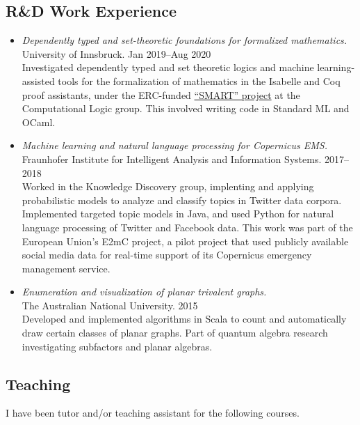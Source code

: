 \documentclass[12pt,a4paper]{article}
\begin{document}
\subsection{R\&D Work Experience}

\begin{itemize}
\item
  \emph{Dependently typed and set-theoretic foundations for formalized mathematics.}\\
  University of Innsbruck.\hfill
  Jan 2019--Aug 2020\\[0.8ex]
  Investigated dependently typed and set theoretic logics and machine learning-assisted tools for the formalization of mathematics in the Isabelle and Coq proof assistants, under the ERC-funded \href{https://project-smart.uibk.ac.at}{``SMART'' project} at the Computational Logic group.
  This involved writing code in Standard ML and OCaml.

\item
  \emph{Machine learning and natural language processing for Copernicus EMS.}\\
  Fraunhofer Institute for Intelligent Analysis and Information Systems.\hfill
  2017--2018\\[0.8ex]
  Worked in the Knowledge Discovery group, implenting and applying probabilistic models to analyze and classify topics in Twitter data corpora.
  Implemented targeted topic models in Java, and used Python for natural language processing of Twitter and Facebook data.
  This work was part of the European Union's E2mC project, a pilot project that used publicly available social media data for real-time support of its Copernicus emergency management service.

\item
  \emph{Enumeration and visualization of planar trivalent graphs.}\\
  The Australian National University.\hfill
  2015\\[0.8ex]
  Developed and implemented algorithms in Scala to count and automatically draw certain classes of planar graphs.
  Part of quantum algebra research investigating subfactors and planar algebras.
\end{itemize}

\subsection{Teaching}

I have been tutor and/or teaching assistant for the following courses.
\end{document}
